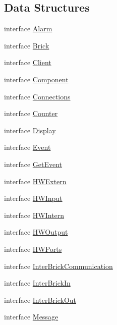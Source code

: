 \subsection*{Data Structures}
\begin{DoxyCompactItemize}
\item 
interface \hyperlink{interfaceshootingmachineemfmodel_1_1_alarm}{Alarm}
\item 
interface \hyperlink{interfaceshootingmachineemfmodel_1_1_brick}{Brick}
\item 
interface \hyperlink{interfaceshootingmachineemfmodel_1_1_client}{Client}
\item 
interface \hyperlink{interfaceshootingmachineemfmodel_1_1_component}{Component}
\item 
interface \hyperlink{interfaceshootingmachineemfmodel_1_1_connections}{Connections}
\item 
interface \hyperlink{interfaceshootingmachineemfmodel_1_1_counter}{Counter}
\item 
interface \hyperlink{interfaceshootingmachineemfmodel_1_1_display}{Display}
\item 
interface \hyperlink{interfaceshootingmachineemfmodel_1_1_event}{Event}
\item 
interface \hyperlink{interfaceshootingmachineemfmodel_1_1_get_event}{Get\-Event}
\item 
interface \hyperlink{interfaceshootingmachineemfmodel_1_1_h_w_extern}{H\-W\-Extern}
\item 
interface \hyperlink{interfaceshootingmachineemfmodel_1_1_h_w_input}{H\-W\-Input}
\item 
interface \hyperlink{interfaceshootingmachineemfmodel_1_1_h_w_intern}{H\-W\-Intern}
\item 
interface \hyperlink{interfaceshootingmachineemfmodel_1_1_h_w_output}{H\-W\-Output}
\item 
interface \hyperlink{interfaceshootingmachineemfmodel_1_1_h_w_ports}{H\-W\-Ports}
\item 
interface \hyperlink{interfaceshootingmachineemfmodel_1_1_inter_brick_communication}{Inter\-Brick\-Communication}
\item 
interface \hyperlink{interfaceshootingmachineemfmodel_1_1_inter_brick_in}{Inter\-Brick\-In}
\item 
interface \hyperlink{interfaceshootingmachineemfmodel_1_1_inter_brick_out}{Inter\-Brick\-Out}
\item 
interface \hyperlink{interfaceshootingmachineemfmodel_1_1_message}{Message}
\item 

\end{DoxyCompactItemize}
